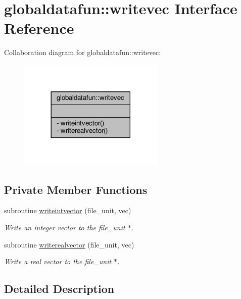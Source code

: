 \hypertarget{interfaceglobaldatafun_1_1writevec}{}\section{globaldatafun\+:\+:writevec Interface Reference}
\label{interfaceglobaldatafun_1_1writevec}


Collaboration diagram for globaldatafun\+:\+:writevec\+:\nopagebreak
\begin{figure}[H]
\begin{center}
\leavevmode
\includegraphics[width=197pt]{interfaceglobaldatafun_1_1writevec__coll__graph}
\end{center}
\end{figure}
\subsection*{Private Member Functions}
\begin{DoxyCompactItemize}
\item 
subroutine \hyperlink{interfaceglobaldatafun_1_1writevec_acaa8979c629439920cf2fcd8dc39652d}{writeintvector} (file\+\_\+unit, vec)
\begin{DoxyCompactList}\small\item\em Write an integer vector to the file\+\_\+unit $\ast$. \end{DoxyCompactList}\item 
subroutine \hyperlink{interfaceglobaldatafun_1_1writevec_a64fd9ea2d0b1776a2844c65a2e7ffac9}{writerealvector} (file\+\_\+unit, vec)
\begin{DoxyCompactList}\small\item\em Write a real vector to the file\+\_\+unit $\ast$. \end{DoxyCompactList}\end{DoxyCompactItemize}


\subsection{Detailed Description}


